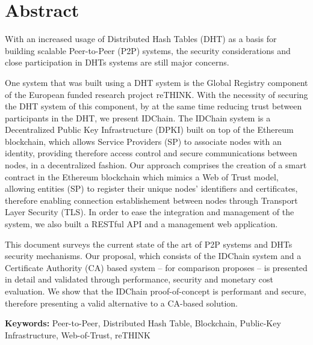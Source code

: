 \chapter*{Abstract}


With an increased usage of Distributed Hash Tables (DHT) as a basis for building scalable Peer-to-Peer (P2P) systems, the security considerations and close participation in DHTs systems are still major concerns.

One system that was built using a DHT system is the Global Registry component of the European funded research project reTHINK.
With the necessity of securing the DHT system of this component, by at the same time reducing trust between participants in the DHT, we present IDChain.
The IDChain system is a Decentralized Public Key Infrastructure (DPKI) built on top of the Ethereum blockchain, which allows Service Providers (SP) to associate nodes with an identity, providing therefore access control and secure communications between nodes, in a decentralized fashion.
Our approach comprises the creation of a smart contract in the Ethereum blockchain which mimics a Web of Trust model, allowing entities (SP) to register their unique nodes' identifiers and certificates, therefore enabling connection establishement between nodes through Transport Layer Security (TLS).
In order to ease the integration and management of the system, we also built a RESTful API and a management web application.

This document surveys the current state of the art of P2P systems and DHTs security mechanisms.
Our proposal, which consists of the IDChain system and a Certificate Authority (CA) based system – for comparison proposes – is presented in detail and validated through performance, security and monetary cost evaluation.
We show that the IDChain proof-of-concept is performant and secure, therefore presenting a valid alternative to a CA-based solution.

\vspace{1cm}

\textbf{\Large Keywords:} Peer-to-Peer, Distributed Hash Table, Blockchain, Public-Key Infrastructure, Web-of-Trust, reTHINK

\cleardoublepage
